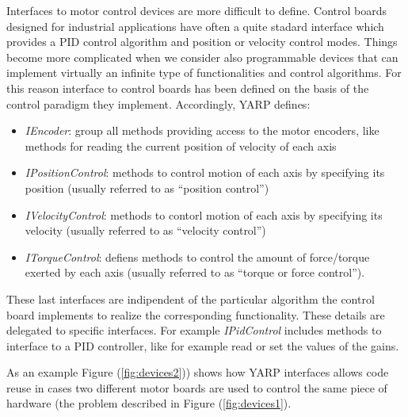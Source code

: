 Interfaces to motor control devices are more difficult to define. Control 
boards designed for industrial applications have often a quite stadard 
interface which provides a PID control algorithm and position or velocity 
control modes. Things become more complicated when we consider also 
programmable devices that can implement virtually an infinite type of 
functionalities and control algorithms. 
For this reason interface to control boards has been defined on the basis 
of the control paradigm they implement. Accordingly, YARP defines:

\begin{itemize}

\item \emph{IEncoder}: group all methods providing access to the motor 
encoders, like methods for reading the current position of velocity of 
each axis

\item \emph{IPositionControl}: methods to control motion of each axis 
by specifying its position (usually referred to as ``position control'')

\item \emph{IVelocityControl}: methods to contorl motion of each axis 
by specifying its velocity (usually referred to as ``velocity control'')

\item \emph{ITorqueControl}: defiens methods to control the amount of 
force/torque exerted by each axis (usually referred to as ``torque or 
force control'').

\end{itemize}

These last interfaces are indipendent of the particular algorithm the 
control board implements to realize the corresponding functionality. 
These details are delegated to specific interfaces. For example 
\emph{IPidControl} includes methods to interface to a PID controller, 
like for example read or set the values of the gains.

As an example Figure (\ref{fig:devices2})) shows how 
YARP interfaces allows code reuse in cases two different motor boards 
are used to control the same piece of hardware (the problem described 
in Figure (\ref{fig:devices1}).

